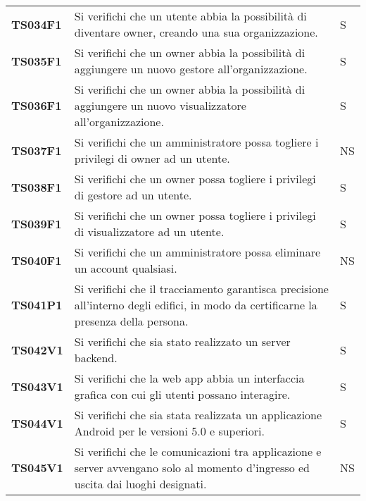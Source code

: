 \documentclass[../../piano-di-qualifica.tex]{subfiles}
\begin{document}
\begin{longtable}[H]{>{\centering\bfseries}m{3cm} >{}m{10cm} >{\centering\arraybackslash}m{3cm}}
  TS034F1            & Si verifichi che un utente abbia la possibilità di diventare owner, creando una sua organizzazione.
  & S               \\

  TS035F1            & Si verifichi che un owner abbia la possibilità di aggiungere un nuovo gestore all'organizzazione.
  & S               \\

  TS036F1            & Si verifichi che un owner abbia la possibilità di aggiungere un nuovo visualizzatore all'organizzazione.
  & S               \\

  TS037F1            & Si verifichi che un amministratore possa togliere i privilegi di owner ad un utente.
  & NS              \\

  TS038F1            & Si verifichi che un owner possa togliere i privilegi di gestore ad un utente.
  & S               \\

  TS039F1            & Si verifichi che un owner possa togliere i privilegi di visualizzatore ad un utente.
  & S               \\

  TS040F1            & Si verifichi che un amministratore possa eliminare un account qualsiasi.
  & NS               \\


  TS041P1            & Si verifichi che il tracciamento garantisca precisione all’interno degli edifici, in modo da certificarne la presenza della persona.
                     & S               \\

  TS042V1            & Si verifichi che sia stato realizzato un server backend.
                     & S               \\

  TS043V1            & Si verifichi che la web app abbia un interfaccia grafica con cui gli utenti possano interagire.
                     & S               \\

  TS044V1            & Si verifichi che sia stata realizzata un applicazione Android per le versioni 5.0 e superiori.
                     & S               \\

  TS045V1            & Si verifichi che le comunicazioni tra applicazione e server avvengano solo al momento d'ingresso ed uscita dai luoghi designati.
                     & NS                                                                                                                                                                                                                                                             \\


\end{longtable}
\end{document}
